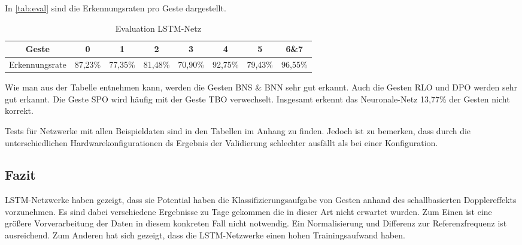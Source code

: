 In \autoref{tab:eval} sind die Erkennungsraten pro Geste dargestellt.

\begin{table*}
\begin{tabular}{|c|c|c|c|c|c|c|c|}
\hline
 Geste 		& 0 & 1 & 2 & 3 & 4 & 5 & 6\&7 \\
 \hline
 Erkennungsrate  &87,23\%&77,35\%&81,48\%&70,90\%&92,75\%&79,43\%&96,55\%		\\
 \hline
\end{tabular}
\caption{Evaluation LSTM-Netz}
\label{tab:eval}
\end{table*}

Wie man aus der Tabelle entnehmen kann, werden die Gesten \ac{BNS} \& \ac{BNN} sehr gut erkannt. 
Auch die Gesten \ac{RLO} und \ac{DPO} werden sehr gut erkannt. Die Geste \ac{SPO} 
wird häufig mit der Geste \ac{TBO} verwechselt.
Insgesamt erkennt das Neuronale-Netz 13,77\% der Gesten nicht korrekt. 

Tests für Netzwerke mit allen Beispieldaten sind in den Tabellen im Anhang zu
finden. Jedoch ist zu bemerken, dass durch die unterschiedlichen
Hardwarekonfigurationen ds Ergebnis der Validierung schlechter ausfällt als bei
einer Konfiguration.


\subsection{Fazit}
\ac{LSTM}-Netzwerke haben gezeigt, dass sie Potential haben die
Klassifizierungsaufgabe von Gesten anhand des schallbasierten Dopplereffekts
vorzunehmen. Es sind dabei verschiedene Ergebnisse zu Tage gekommen die in dieser
Art nicht erwartet wurden. Zum Einen ist eine größere Vorverarbeitung der
Daten in diesem konkreten Fall nicht notwendig. Ein Normalisierung und Differenz
zur Referenzfrequenz ist ausreichend. Zum Anderen hat sich gezeigt, dass die
\ac{LSTM}-Netzwerke einen hohen Trainingsaufwand haben. 

